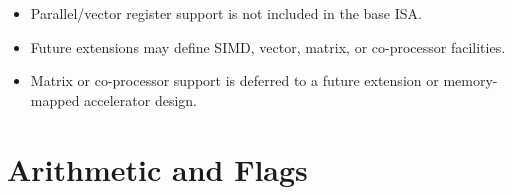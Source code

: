 \begin{itemize}
\begin{itemize}
              status-register value saved on exception entry;
        \item {}: exception cause;
        \item {}: exception-specific data associated with the most
              recent exception or interrupt.
        \item {}: exception vector base.
        \end{itemize}
  \item Parallel/vector register support is not included in the base ISA.
  \item Future extensions may define SIMD, vector, matrix, or co-processor
        facilities.
  \item Matrix or co-processor support is deferred to a future extension or
        memory-mapped accelerator design.
\end{itemize}

\section{Arithmetic and Flags}

